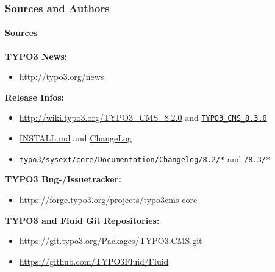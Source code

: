 \begin{frame}[fragile]
	\frametitle{Sources and Authors}
	\framesubtitle{Sources}

	\textbf{TYPO3 News:}
		\begin{itemize}\smaller
			\item \url{http://typo3.org/news}
		\end{itemize}

	\textbf{Release Infos:}
		\begin{itemize}\smaller
			\item \url{http://wiki.typo3.org/TYPO3_CMS_8.2.0} and \texttt{\href{http://wiki.typo3.org/TYPO3_CMS_8.3.0}{TYPO3\_CMS\_8.3.0}}
			\item \href{https://github.com/TYPO3/TYPO3.CMS/blob/master/INSTALL.md}{INSTALL.md}
				and \href{https://github.com/TYPO3/TYPO3.CMS/tree/master/typo3/sysext/core/Documentation/Changelog}{ChangeLog}
			\item \texttt{typo3/sysext/core/Documentation/Changelog/8.2/*} and \texttt{/8.3/*}
		\end{itemize}

	\textbf{TYPO3 Bug-/Issuetracker:}
		\begin{itemize}\smaller
			\item \url{https://forge.typo3.org/projects/typo3cms-core}
		\end{itemize}

	\textbf{TYPO3 and Fluid Git Repositories:}
		\begin{itemize}\smaller
			\item \url{https://git.typo3.org/Packages/TYPO3.CMS.git}
			\item \url{https://github.com/TYPO3Fluid/Fluid}
		\end{itemize}

\end{frame}


